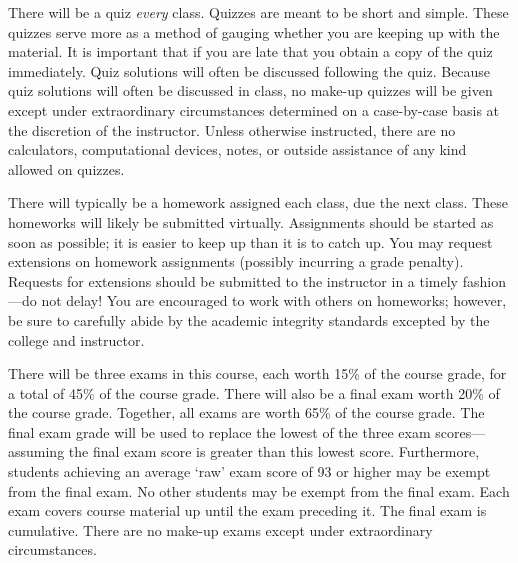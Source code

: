 \documentclass[11pt,letterpaper]{article}
\begin{document}
There will be a quiz \textit{every} class. Quizzes are meant to be short and simple. These quizzes serve more as a method of gauging whether you are keeping up with the material. It is important that if you are late that you obtain a copy of the quiz immediately. Quiz solutions will often be discussed following the quiz. Because quiz solutions will often be discussed in class, no make-up quizzes will be given except under extraordinary circumstances determined on a case-by-case basis at the discretion of the instructor. Unless otherwise instructed, there are no calculators, computational devices, notes, or outside assistance of any kind allowed on quizzes. \pspace


There will typically be a homework assigned each class, due the next class. These homeworks will likely be submitted virtually. Assignments should be started as soon as possible; it is easier to keep up than it is to catch up. You may request extensions on homework assignments (possibly incurring a grade penalty). Requests for extensions should be submitted to the instructor in a timely fashion---do not delay! You are encouraged to work with others on homeworks; however, be sure to carefully abide by the academic integrity standards excepted by the college and instructor. \pspace


There will be three exams in this course, each worth 15\% of the course grade, for a total of 45\% of the course grade. There will also be a final exam worth 20\% of the course grade. Together, all exams are worth 65\% of the course grade. The final exam grade will be used to replace the lowest of the three exam scores---assuming the final exam score is greater than this lowest score. Furthermore, students achieving an average `raw' exam score of 93 or higher may be exempt from the final exam. No other students may be exempt from the final exam. Each exam covers course material up until the exam preceding it. The final exam is cumulative. There are no make-up exams except under extraordinary circumstances. \pspace
\end{document}
